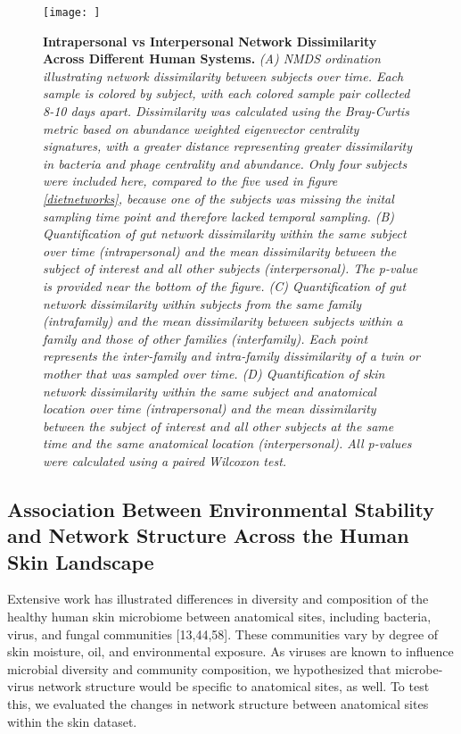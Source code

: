 \documentclass[12pt,]{article}
\begin{document}
\begin{figure}[htbp]
\centering
\texttt{[image: ]}
\caption{\textbf{Intrapersonal vs Interpersonal Network Dissimilarity
Across Different Human Systems.} \emph{(A) NMDS ordination illustrating
network dissimilarity between subjects over time. Each sample is colored
by subject, with each colored sample pair collected 8-10 days apart.
Dissimilarity was calculated using the Bray-Curtis metric based on
abundance weighted eigenvector centrality signatures, with a greater
distance representing greater dissimilarity in bacteria and phage
centrality and abundance. Only four subjects were included here,
compared to the five used in figure \ref{dietnetworks}, because one of
the subjects was missing the inital sampling time point and therefore
lacked temporal sampling. (B) Quantification of gut network
dissimilarity within the same subject over time (intrapersonal) and the
mean dissimilarity between the subject of interest and all other
subjects (interpersonal). The p-value is provided near the bottom of the
figure. (C) Quantification of gut network dissimilarity within subjects
from the same family (intrafamily) and the mean dissimilarity between
subjects within a family and those of other families (interfamily). Each
point represents the inter-family and intra-family dissimilarity of a
twin or mother that was sampled over time. (D) Quantification of skin
network dissimilarity within the same subject and anatomical location
over time (intrapersonal) and the mean dissimilarity between the subject
of interest and all other subjects at the same time and the same
anatomical location (interpersonal). All p-values were calculated using
a paired Wilcoxon test.}\label{intradiv}}
\end{figure}

\subsection{Association Between Environmental Stability and Network
Structure Across the Human Skin
Landscape}\label{association-between-environmental-stability-and-network-structure-across-the-human-skin-landscape}

Extensive work has illustrated differences in diversity and composition
of the healthy human skin microbiome between anatomical sites, including
bacteria, virus, and fungal communities {[}13,44,58{]}. These
communities vary by degree of skin moisture, oil, and environmental
exposure. As viruses are known to influence microbial diversity and
community composition, we hypothesized that microbe-virus network
structure would be specific to anatomical sites, as well. To test this,
we evaluated the changes in network structure between anatomical sites
within the skin dataset.
\end{document}
